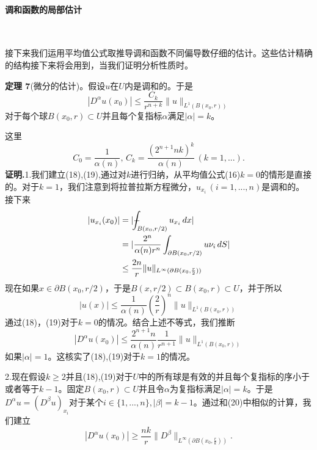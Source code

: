 \documentclass[leqno]{article}
\def\Xint#1{\mathchoice
	{\XXint\displaystyle\textstyle{#1}}%
	{\XXint\textstyle\scriptstyle{#1}}%
	{\XXint\scriptstyle\scriptscriptstyle{#1}}%
	{\XXint\scriptscriptstyle\scriptscriptstyle{#1}}%
	\!\int}
\def\XXint#1#2#3{{\setbox0=\hbox{$#1{#2#3}{\int}$ }
		\vcenter{\hbox{$#2#3$ }}\kern-.6\wd0}}
\def\dashint{\Xint-}
\numberwithin{equation}{subsection}%
\begin{document}
\paragraph{调和函数的局部估计}~{}
\par
接下来我们运用平均值公式取推导调和函数不同偏导数仔细的估计。这些估计精确的结构接下来将会用到，当我们证明分析性质时。
\par
\noindent\textbf{定理 7}(微分的估计)。假设$u$在$U$内是调和的。于是
\begin{equation}
|D^{\alpha}u(x_{0})|\leq\frac{C_{k}}{r^{n+k}}\|u\|_{L^{1}(B(x_{0},r))}
\end{equation}
对于每个球$B(x_{0},r)\subset U$并且每个复指标$\alpha$满足$|\alpha|=k$。
\par
这里
\begin{equation}
C_{0}=\frac{1}{\alpha (n)},\,C_{k}=\frac{(2^{n+1}nk)^{k}}{\alpha (n)}\,(k=1,...).
\end{equation}
\textbf{证明.}1.我们建立(18),(19),通过对$k$进行归纳，从平均值公式(16)$k=0$的情形是直接的。对于$k=1$，我们注意到将拉普拉斯方程微分，$u_{x_{i}}\,(i=1,...,n)$是调和的。接下来
\begin{equation}
\begin{aligned}
|u_{x_{i}}(x_{0})|&=|\dashint_{B(x_{0},r/2)}u_{x_{i}}\,dx|\\
&=|\frac{2^{n}}{\alpha(n)r^{n}}\int_{\partial B(x_{0},r/2)}u\nu_{i}\,dS|\\
&\leq\frac{2n}{r}\|u\|_{L^{\infty}(\partial B(x_{0},\frac{r}{2}))}
\end{aligned}
\end{equation}
现在如果$x\in\partial B(x_{0},r/2)$，于是$B(x,r/2)\subset B(x_{0},r)\subset U$，并于所以
\begin{equation*}
|u(x)|\leq\frac{1}{\alpha(n)}\left(\frac{2}{r}\right)^{n}\|u\|_{L^{1}(B(x_{0},r))}
\end{equation*}
通过(18)，(19)对于$k=0$的情况。结合上述不等式，我们推断
\begin{equation*}
|D^{\alpha}u(x_{0})|\leq\frac{2^{n+1}n}{\alpha(n)}\frac{1}{r^{n+1}}\|u\|_{L^{1}(B(x_{0},r))}
\end{equation*}
如果$|\alpha|=1$。这核实了(18),(19)对于$k=1$的情况。
\par
2.现在假设$k\geq 2$并且(18),(19)对于$U$中的所有球是有效的并且每个复指标的序小于或者等于$k-1$。固定$B(x_{0},r)\subset U$并且令$\alpha$为复指标满足$|\alpha|=k$。于是$D^{\alpha}u=(D^{\beta}u)_{x_{i}}$对于某个$i\in\{1,...,n\},|\beta|=k-1$。通过和(20)中相似的计算，我们建立
\begin{equation*}
|D^{\alpha}u(x_{0})|\geq\frac{nk}{r}\|D^{\beta}\|_{L^{\infty}(\partial B(x_{0},\frac{r}{k}))}.
\end{equation*}
\end{document}
